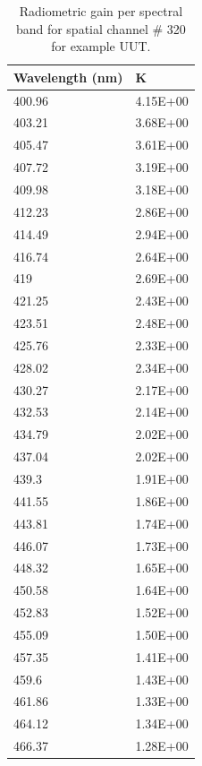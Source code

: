\documentclass[nohyper,nobib]{tufte-book}
\begin{document}
\begin{table}[]
\centering
\begin{tabular}{@{}ll@{}}
\toprule
Wavelength (nm) & K        \\ \midrule
400.96          & 4.15E+00 \\
403.21          & 3.68E+00 \\
405.47          & 3.61E+00 \\
407.72          & 3.19E+00 \\
409.98          & 3.18E+00 \\
412.23          & 2.86E+00 \\
414.49          & 2.94E+00 \\
416.74          & 2.64E+00 \\
419             & 2.69E+00 \\
421.25          & 2.43E+00 \\
423.51          & 2.48E+00 \\
425.76          & 2.33E+00 \\
428.02          & 2.34E+00 \\
430.27          & 2.17E+00 \\
432.53          & 2.14E+00 \\
434.79          & 2.02E+00 \\
437.04          & 2.02E+00 \\
439.3           & 1.91E+00 \\
441.55          & 1.86E+00 \\
443.81          & 1.74E+00 \\
446.07          & 1.73E+00 \\
448.32          & 1.65E+00 \\
450.58          & 1.64E+00 \\
452.83          & 1.52E+00 \\
455.09          & 1.50E+00 \\
457.35          & 1.41E+00 \\
459.6           & 1.43E+00 \\
461.86          & 1.33E+00 \\
464.12          & 1.34E+00 \\
466.37          & 1.28E+00 \\ \bottomrule
\end{tabular}
\caption{Radiometric gain per spectral band for spatial channel \# 320 for example UUT.}
\label{tab:my-table-3}
\end{table}
\end{document}
